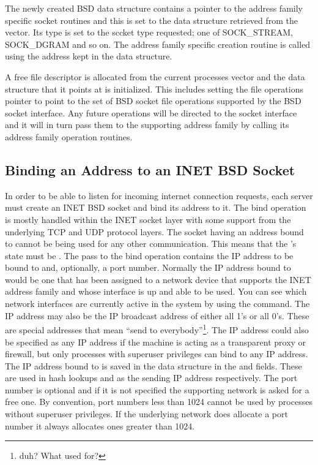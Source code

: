 The newly created BSD  data structure contains a pointer to the address family
specific socket routines and this is set to the  data structure retrieved from
the  vector.
Its type is set to the sccket type requested; one of SOCK\_STREAM, SOCK\_DGRAM and so on.
The address family specific creation routine is called using the address kept in the 
 data structure.

A free file descriptor is allocated from the current processes  vector
and the  data structure that it points at is initialized.
This includes setting the file operations pointer to point to the set of BSD socket file
operations supported by the BSD socket interface.
Any future operations will be directed to the socket interface
and it will in turn pass them to the supporting address family by calling its address family operation
routines.

\subsection{Binding an Address to an INET BSD Socket}
In order to be able to listen for incoming internet connection requests, each server must create an
INET BSD socket and bind its address to it.
The bind operation is mostly handled within the INET socket layer with some support from the
underlying TCP and UDP protocol layers.
The socket having an address bound to cannot be being used for any other communication.
This means that the 's state must be .
The  pass to the bind operation contains the IP address to be bound to and, optionally,
a port number.
Normally the IP address bound to would be one that has been assigned to a network device
that supports the INET address family and whose interface is up and able to be used.
You can see which network interfaces are currently active in the system by using the 
 command.
The IP address may also be the IP broadcast address of either all 1's or all 0's.
These are special addresses that mean ``send to everybody''\footnote{duh?  What used for?}.
The IP address could also be specified as any IP address if the machine is acting as a transparent
proxy or firewall, but only processes with superuser privileges can bind to any IP address.
The IP address bound to is saved in the  data structure in the  and
 fields.
These are used in hash lookups and as the sending IP address respectively.
The port number is optional and if it is not specified the supporting network
is asked for a free one.
By convention, port numbers less than 1024 cannot be used by processes without superuser privileges.
If the underlying network does allocate a port number it always allocates ones greater than
1024.


